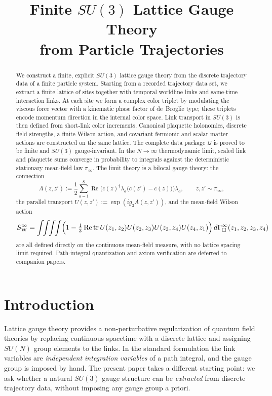 \documentclass[11pt]{article}
\title{Finite $SU(3)$ Lattice Gauge Theory\\
from Particle Trajectories}
\author{}
\date{}
\theoremstyle{remark}
\begin{document}
\maketitle

\begin{abstract}
We construct a finite, explicit $SU(3)$ lattice gauge theory from the discrete
trajectory data of a finite particle system.
Starting from a recorded trajectory data set, we extract a finite lattice of
sites together with temporal worldline links and same-time interaction links.
At each site we form a complex color triplet by modulating the viscous force
vector with a kinematic phase factor of de~Broglie type; these triplets encode
momentum direction in the internal color space.
Link transport in $SU(3)$ is then defined from short-link color increments.
Canonical plaquette holonomies, discrete field strengths, a finite Wilson action,
and covariant fermionic and scalar matter actions are constructed on the same
lattice.
The complete data package $\mathcal Q$ is proved to be finite and $SU(3)$
gauge-invariant.
In the $N\to\infty$ thermodynamic limit, scaled link and plaquette sums converge
in probability to integrals against the deterministic stationary mean-field law
$\pi_\infty$.
The limit theory is a bilocal gauge theory: the connection
\[
A(z,z'):=\frac12\sum_{a=1}^8
\operatorname{Re}\!\bigl(c(z)^\dagger\lambda_a\bigl(c(z')-c(z)\bigr)\bigr)\lambda_a,
\qquad z,z'\sim\pi_\infty,
\]
the parallel transport $U(z,z'):=\exp(ig_3 A(z,z'))$, and the mean-field Wilson
action
\[
S_{\mathrm W}^\infty
=\int\!\!\int\!\!\int\!\!\int
\Bigl(1-\tfrac13\operatorname{Re}\operatorname{tr} U(z_1,z_2)U(z_2,z_3)U(z_3,z_4)U(z_4,z_1)\Bigr)
\,d\Gamma_\square^\infty(z_1,z_2,z_3,z_4)
\]
are all defined directly on the continuous mean-field measure, with no lattice
spacing limit required.
Path-integral quantization and axiom verification are deferred to companion papers.
\end{abstract}

\tableofcontents

\section{Introduction}
\label{sec:intro}

Lattice gauge theory provides
a non-perturbative regularization of quantum field theories by replacing
continuous spacetime with a discrete lattice and assigning $SU(N)$ group elements
to the links.
In the standard formulation the link variables are
\emph{independent integration variables} of a path integral, and the gauge group
is imposed by hand.
The present paper takes a different starting point: we ask whether a natural
$SU(3)$ gauge structure can be \emph{extracted} from discrete trajectory data,
without imposing any gauge group a priori.
\end{document}
